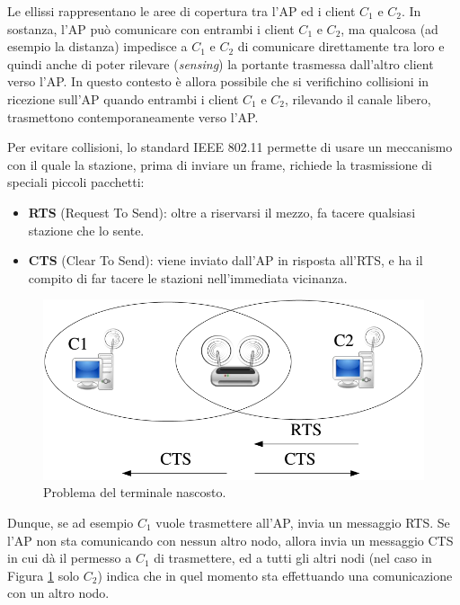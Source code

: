 Le ellissi rappresentano le aree di copertura tra l'AP ed i client $C_1$ e $C_2$. In sostanza, l'AP può comunicare con entrambi i client $C_1$ e $C_2$, ma qualcosa (ad esempio la distanza) impedisce a $C_1$ e $C_2$ di comunicare direttamente tra loro e quindi anche di poter rilevare (\textit{sensing}) la portante trasmessa dall'altro client verso l'AP. In questo contesto è allora possibile che si verifichino collisioni in ricezione sull'AP quando entrambi i client $C_1$ e $C_2$, rilevando il canale libero, trasmettono contemporaneamente verso l'AP. \newpage

Per evitare collisioni, lo standard IEEE 802.11 permette di usare un meccanismo con il quale la stazione, prima di inviare un frame, richiede la trasmissione di speciali piccoli pacchetti:
\begin{itemize}
	\item \textbf{RTS} (Request To Send): oltre a riservarsi il mezzo, fa tacere qualsiasi stazione che lo sente.
	\item \textbf{CTS} (Clear To Send): viene inviato dall'AP in risposta all'RTS, e ha il compito di far tacere le stazioni nell'immediata vicinanza.
\end{itemize}
\begin{figure}[h]
	\centering
	\includegraphics[scale = 0.5]{images/hidden-node-problem}
	\caption{Problema del terminale nascosto.}
	\label{img:hidden-node-problem}
\end{figure}
Dunque, se ad esempio $C_1$ vuole trasmettere all'AP, invia un messaggio RTS. Se l'AP non sta comunicando con nessun altro nodo, allora invia un messaggio CTS in cui dà il permesso a $C_1$ di trasmettere, ed a tutti gli altri nodi (nel caso in Figura \ref{img:hidden-node-problem} solo $C_2$) indica che in quel momento sta effettuando una comunicazione con un altro nodo.
